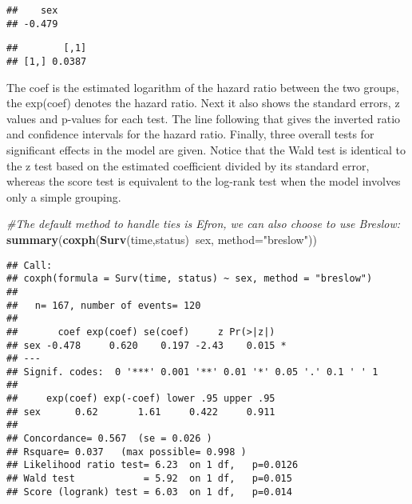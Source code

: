 \documentclass[]{book}
\newenvironment{Shaded}{\begin{snugshade}}{\end{snugshade}}
\newcommand{\KeywordTok}[1]{\textcolor[rgb]{0.13,0.29,0.53}{\textbf{#1}}}
\newcommand{\DataTypeTok}[1]{\textcolor[rgb]{0.13,0.29,0.53}{#1}}
\newcommand{\StringTok}[1]{\textcolor[rgb]{0.31,0.60,0.02}{#1}}
\newcommand{\CommentTok}[1]{\textcolor[rgb]{0.56,0.35,0.01}{\textit{#1}}}
\newcommand{\OperatorTok}[1]{\textcolor[rgb]{0.81,0.36,0.00}{\textbf{#1}}}
\newcommand{\NormalTok}[1]{#1}
\theoremstyle{definition}
\theoremstyle{definition}
\theoremstyle{definition}
\theoremstyle{remark}
\begin{document}
\begin{Shaded}
\end{Shaded}

\begin{verbatim}
##    sex 
## -0.479
\end{verbatim}

\begin{Shaded}
\end{Shaded}

\begin{verbatim}
##        [,1]
## [1,] 0.0387
\end{verbatim}

The coef is the estimated logarithm of the hazard ratio between the two
groups, the exp(coef) denotes the hazard ratio. Next it also shows the
standard errors, z values and p-values for each test. The line following
that gives the inverted ratio and confidence intervals for the hazard
ratio. Finally, three overall tests for significant effects in the model
are given. Notice that the Wald test is identical to the z test based on
the estimated coefficient divided by its standard error, whereas the
score test is equivalent to the log-rank test when the model involves
only a simple grouping.

\begin{Shaded}
\begin{Highlighting}[]
\CommentTok{#The default method to handle ties is Efron, we can also choose to use Breslow:}
\KeywordTok{summary}\NormalTok{(}\KeywordTok{coxph}\NormalTok{(}\KeywordTok{Surv}\NormalTok{(time,status)}\OperatorTok{~}\NormalTok{sex, }\DataTypeTok{method=}\StringTok{"breslow"}\NormalTok{))}
\end{Highlighting}
\end{Shaded}

\begin{verbatim}
## Call:
## coxph(formula = Surv(time, status) ~ sex, method = "breslow")
## 
##   n= 167, number of events= 120 
## 
##       coef exp(coef) se(coef)     z Pr(>|z|)  
## sex -0.478     0.620    0.197 -2.43    0.015 *
## ---
## Signif. codes:  0 '***' 0.001 '**' 0.01 '*' 0.05 '.' 0.1 ' ' 1
## 
##     exp(coef) exp(-coef) lower .95 upper .95
## sex      0.62       1.61     0.422     0.911
## 
## Concordance= 0.567  (se = 0.026 )
## Rsquare= 0.037   (max possible= 0.998 )
## Likelihood ratio test= 6.23  on 1 df,   p=0.0126
## Wald test            = 5.92  on 1 df,   p=0.015
## Score (logrank) test = 6.03  on 1 df,   p=0.014
\end{verbatim}
\end{document}
